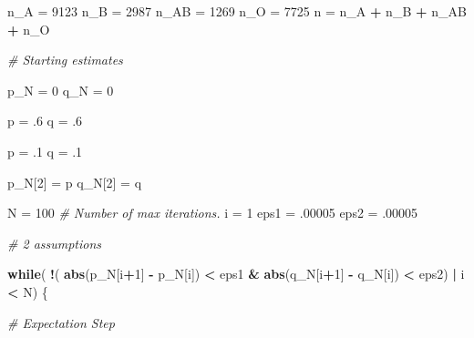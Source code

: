 \documentclass[]{article}
\newenvironment{Shaded}{\begin{snugshade}}{\end{snugshade}}
\newcommand{\KeywordTok}[1]{\textcolor[rgb]{0.13,0.29,0.53}{\textbf{#1}}}
\newcommand{\DecValTok}[1]{\textcolor[rgb]{0.00,0.00,0.81}{#1}}
\newcommand{\StringTok}[1]{\textcolor[rgb]{0.31,0.60,0.02}{#1}}
\newcommand{\CommentTok}[1]{\textcolor[rgb]{0.56,0.35,0.01}{\textit{#1}}}
\newcommand{\ControlFlowTok}[1]{\textcolor[rgb]{0.13,0.29,0.53}{\textbf{#1}}}
\newcommand{\OperatorTok}[1]{\textcolor[rgb]{0.81,0.36,0.00}{\textbf{#1}}}
\newcommand{\NormalTok}[1]{#1}
\begin{document}
\begin{Shaded}
\begin{Highlighting}[]
\NormalTok{n_A =}\StringTok{ }\DecValTok{9123}
\NormalTok{n_B =}\StringTok{ }\DecValTok{2987}
\NormalTok{n_AB =}\StringTok{ }\DecValTok{1269}
\NormalTok{n_O =}\StringTok{ }\DecValTok{7725}
\NormalTok{n =}\StringTok{ }\NormalTok{n_A }\OperatorTok{+}\StringTok{ }\NormalTok{n_B }\OperatorTok{+}\StringTok{ }\NormalTok{n_AB }\OperatorTok{+}\StringTok{ }\NormalTok{n_O}

\CommentTok{# Starting estimates}

\NormalTok{p_N =}\StringTok{ }\DecValTok{0}
\NormalTok{q_N =}\StringTok{ }\DecValTok{0}

\NormalTok{p =}\StringTok{ }\NormalTok{.}\DecValTok{6}
\NormalTok{q =}\StringTok{ }\NormalTok{.}\DecValTok{6}

\NormalTok{p =}\StringTok{ }\NormalTok{.}\DecValTok{1}
\NormalTok{q =}\StringTok{ }\NormalTok{.}\DecValTok{1}

\NormalTok{p_N[}\DecValTok{2}\NormalTok{] =}\StringTok{ }\NormalTok{p}
\NormalTok{q_N[}\DecValTok{2}\NormalTok{] =}\StringTok{ }\NormalTok{q}

\NormalTok{N =}\StringTok{ }\DecValTok{100} \CommentTok{# Number of max iterations.}
\NormalTok{i =}\StringTok{ }\DecValTok{1}
\NormalTok{eps1 =}\StringTok{ }\NormalTok{.}\DecValTok{00005}
\NormalTok{eps2 =}\StringTok{ }\NormalTok{.}\DecValTok{00005}

\CommentTok{# 2 assumptions }

\ControlFlowTok{while}\NormalTok{( }\OperatorTok{!}\NormalTok{( }\KeywordTok{abs}\NormalTok{(p_N[i}\OperatorTok{+}\DecValTok{1}\NormalTok{] }\OperatorTok{-}\StringTok{ }\NormalTok{p_N[i]) }\OperatorTok{<}\StringTok{ }\NormalTok{eps1 }\OperatorTok{&}\StringTok{ }\KeywordTok{abs}\NormalTok{(q_N[i}\OperatorTok{+}\DecValTok{1}\NormalTok{] }\OperatorTok{-}\StringTok{ }\NormalTok{q_N[i]) }\OperatorTok{<}\StringTok{ }\NormalTok{eps2) }\OperatorTok{|}\StringTok{ }\NormalTok{i }\OperatorTok{<}\StringTok{ }\NormalTok{N) \{ }
      
        \CommentTok{# Expectation Step}
      

\end{Highlighting}
\end{Shaded}
\end{document}
